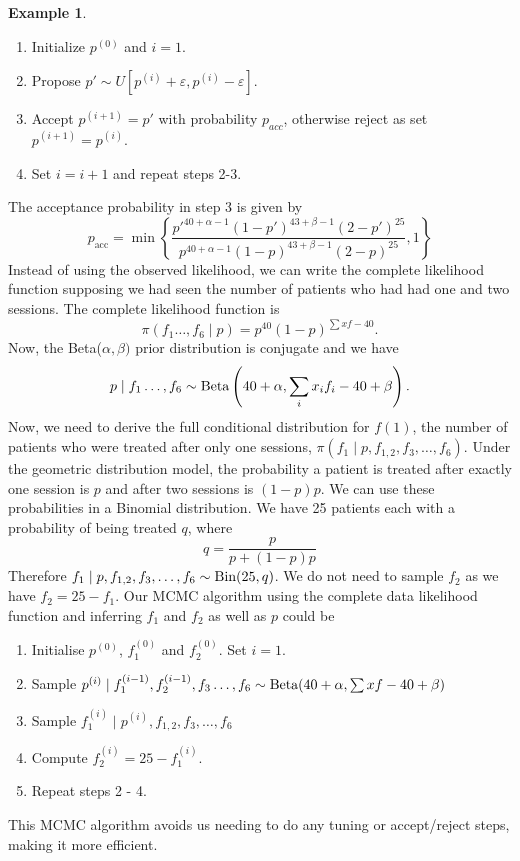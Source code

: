 \documentclass[
]{book}
\providecommand{\tightlist}{%
  \setlength{\itemsep}{0pt}\setlength{\parskip}{0pt}}
\theoremstyle{definition}
\theoremstyle{definition}
\newtheorem{example}{Example}[chapter]
\theoremstyle{definition}
\theoremstyle{definition}
\theoremstyle{remark}
\begin{document}
\begin{example}
\begin{enumerate}
\def\labelenumi{\arabic{enumi}.}
\tightlist
\item
  Initialize \(p^{(0)}\) and \(i = 1\).
\item
  Propose \(p' \sim U[p^{(i)} + \varepsilon, p^{(i)} - \varepsilon]\).
\item
  Accept \(p^{(i+1)}=p'\) with probability \(p_{acc}\), otherwise reject as set \(p^{(i+1)}=p^{(i)}\).
\item
  Set \(i=i+1\) and repeat steps 2-3.
\end{enumerate}

The acceptance probability in step 3 is given by
\[
p_{\textrm{acc}} = \min\left\{\frac{p'^{40 + \alpha - 1}(1-p')^{43 + \beta - 1}(2-p')^{25}}{p^{40 + \alpha - 1}(1-p)^{43 + \beta - 1}(2-p)^{25}} ,1\right\}
\]
Instead of using the observed likelihood, we can write the complete likelihood function supposing we had seen the number of patients who had had one and two sessions. The complete likelihood function is
\[
\pi(f_1 \ldots, f_6 \mid p) = p^{40}(1-p)^{\sum xf - 40}. 
\]
Now, the Beta(\(\alpha, \beta)\) prior distribution is conjugate and we have
\[
p \mid f_1 \ldots, f_6  \sim \hbox{Beta}\left(40 + \alpha, \sum_i  x_if_i - 40 + \beta\right).
\]
Now, we need to derive the full conditional distribution for \(f(1)\), the number of patients who were treated after only one sessions, \(\pi(f_1 \mid p, f_{1, 2}, f_3, \ldots, f_6)\). Under the geometric distribution model, the probability a patient is treated after exactly one session is \(p\) and after two sessions is \((1-p)p\). We can use these probabilities in a Binomial distribution. We have 25 patients each with a probability of being treated \(q\), where
\[
q = \frac{p}{p + (1-p)p}
\]
Therefore \(f_1 \mid p, f_{1, 2}, f_3, \ldots, f_6 \sim \hbox{Bin}(25, q)\). We do not need to sample \(f_2\) as we have \(f_2 = 25 - f_1\). Our MCMC algorithm using the complete data likelihood function and inferring \(f_1\) and \(f_2\) as well as \(p\) could be

\begin{enumerate}
\def\labelenumi{\arabic{enumi}.}
\tightlist
\item
  Initialise \(p^{(0)}\), \(f_1^{(0)}\) and \(f_2^{(0)}\). Set \(i = 1\).
\item
  Sample \(p^{(i)} \mid f_1^{(i-1)}, f_2^{(i-1)}, f_3 \ldots, f_6 \sim \hbox{Beta}(40 + \alpha, \sum xf - 40 + \beta)\)
\item
  Sample \(f_1^{(i)} \mid p^{(i)}, f_{1, 2}, f_3, \ldots, f_6\)
\item
  Compute \(f_2^{(i)} = 25 - f_1^{(i)}\).
\item
  Repeat steps 2 - 4.
\end{enumerate}

This MCMC algorithm avoids us needing to do any tuning or accept/reject steps, making it more efficient.
\end{example}
\end{document}
